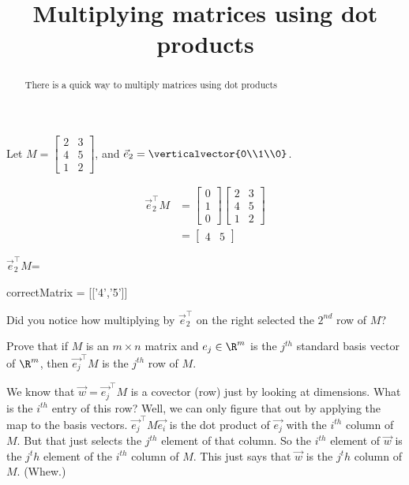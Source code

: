 \documentclass{ximera}
\title{Multiplying matrices using dot products}
\begin{document}
\begin{abstract}
	There is a quick way to multiply matrices using dot products
\end{abstract}\maketitle

\begin{question}
	Let $M =  \begin{bmatrix}2&3\\4&5\\1&2\end{bmatrix}$, and $\vec{e}_2 = \verticalvector{0\\1\\0}$.
	\begin{solution}
	\begin{hint}
		\begin{align*}
			\vec{e}_2^\top M &= \begin{bmatrix} 0\\1\\0\end{bmatrix} \begin{bmatrix}2&3\\4&5\\1&2\end{bmatrix}\\
			&= \begin{bmatrix} 4&5\end{bmatrix}
		\end{align*}
	\end{hint}
		$\vec{e}_2^\top M$=
		\begin{matrix-answer}[name=w]
			correctMatrix = [['4','5']]
		\end{matrix-answer}
	\end{solution}
	
	Did you notice how multiplying by $\vec{e}_2^\top$ on the right selected the $2^{nd}$ row of $M$?
\end{question}

Prove that if $M$ is an $m \times n$ matrix and $e_j \in \R^m$ is the $j^{th}$ standard basis vector of $\R^m$, then
$\vec{e_j}^\top M $ is the $j^{th}$ row of $M$.
\begin{free-response}
We know that $\vec{w} = \vec{e_j}^\top M$ is a covector (row) just by looking at dimensions.  What is the $i^{th}$ entry of this row?
Well, we can only figure that out by applying the map to the basis vectors.  $\vec{e_j}^\top M\vec{e_i}$ is the dot product of $\vec{e_j}$ with the
$i^{th}$ column of $M$.  But that just selects the $j^{th}$ element of that column.  So the $i^{th}$ element of $\vec{w}$ is the $j^th$ element of the $i^{th}$ column
of $M$.  This just says that $\vec{w}$ is the $j^th$ column of $M$. (Whew.)
\end{free-response}
\end{document}
